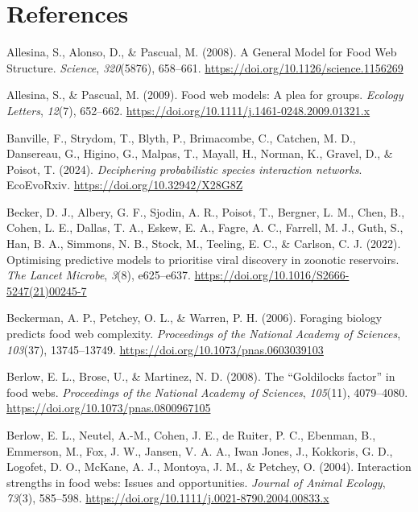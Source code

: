 \documentclass[
]{article}
\newlength{\cslhangindent}
\newenvironment{CSLReferences}[2] %
 {\begin{list}{}{%
  \setlength{\itemindent}{0pt}
  \setlength{\leftmargin}{0pt}
  \setlength{\parsep}{0pt}
  \ifodd #1
   \setlength{\leftmargin}{\cslhangindent}
   \setlength{\itemindent}{-1\cslhangindent}
  \fi
  \setlength{\itemsep}{#2\baselineskip}}}
 {\end{list}}
\begin{document}
\section*{References}\label{references}

\label{refs}
\begin{CSLReferences}{1}{0}
Allesina, S., Alonso, D., \& Pascual, M. (2008). A {General Model} for
{Food Web Structure}. \emph{Science}, \emph{320}(5876), 658--661.
\url{https://doi.org/10.1126/science.1156269}

Allesina, S., \& Pascual, M. (2009). Food web models: A plea for groups.
\emph{Ecology Letters}, \emph{12}(7), 652--662.
\url{https://doi.org/10.1111/j.1461-0248.2009.01321.x}

Banville, F., Strydom, T., Blyth, P., Brimacombe, C., Catchen, M. D.,
Dansereau, G., Higino, G., Malpas, T., Mayall, H., Norman, K., Gravel,
D., \& Poisot, T. (2024). \emph{Deciphering probabilistic species
interaction networks}. EcoEvoRxiv. \url{https://doi.org/10.32942/X28G8Z}

Becker, D. J., Albery, G. F., Sjodin, A. R., Poisot, T., Bergner, L. M.,
Chen, B., Cohen, L. E., Dallas, T. A., Eskew, E. A., Fagre, A. C.,
Farrell, M. J., Guth, S., Han, B. A., Simmons, N. B., Stock, M.,
Teeling, E. C., \& Carlson, C. J. (2022). Optimising predictive models
to prioritise viral discovery in zoonotic reservoirs. \emph{The Lancet
Microbe}, \emph{3}(8), e625--e637.
\url{https://doi.org/10.1016/S2666-5247(21)00245-7}

Beckerman, A. P., Petchey, O. L., \& Warren, P. H. (2006). Foraging
biology predicts food web complexity. \emph{Proceedings of the National
Academy of Sciences}, \emph{103}(37), 13745--13749.
\url{https://doi.org/10.1073/pnas.0603039103}

Berlow, E. L., Brose, U., \& Martinez, N. D. (2008). The {``{Goldilocks}
factor''} in food webs. \emph{Proceedings of the National Academy of
Sciences}, \emph{105}(11), 4079--4080.
\url{https://doi.org/10.1073/pnas.0800967105}

Berlow, E. L., Neutel, A.-M., Cohen, J. E., de Ruiter, P. C., Ebenman,
B., Emmerson, M., Fox, J. W., Jansen, V. A. A., Iwan Jones, J.,
Kokkoris, G. D., Logofet, D. O., McKane, A. J., Montoya, J. M., \&
Petchey, O. (2004). Interaction strengths in food webs: Issues and
opportunities. \emph{Journal of Animal Ecology}, \emph{73}(3), 585--598.
\url{https://doi.org/10.1111/j.0021-8790.2004.00833.x}


\end{CSLReferences}
\end{document}
